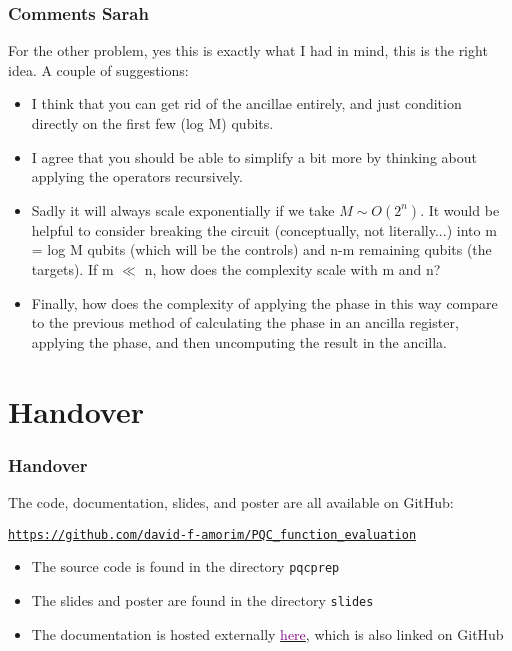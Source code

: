 \documentclass{beamer}
\begin{document}
\begin{frame}
\frametitle{Comments Sarah}
For the other problem, yes this is exactly what I had in mind, this is the right idea. A couple of suggestions:
\begin{itemize}
\item I think that you can get rid of the ancillae entirely, and just condition directly on the first few (log M) qubits.
\item I agree that you should be able to simplify a bit more by thinking about applying the operators recursively.
\item Sadly it will always scale exponentially if we take $M \sim O(2^n)$. It would be helpful to consider breaking the circuit (conceptually, not literally...) into m = log M qubits (which will be the controls) and n-m remaining qubits (the targets). If m $\ll$ n, how does the complexity scale with m and n?
\item Finally, how does the complexity of applying the phase in this way compare to the previous method of calculating the phase in an ancilla register, applying the phase, and then uncomputing the result in the ancilla.
\end{itemize}

\end{frame}



\section{Handover}

\begin{frame}

\frametitle{Handover}

The code, documentation, slides, and poster are all available on GitHub:
\begin{center}
\vspace{0.6cm}
\href{https://github.com/david-f-amorim/PQC_function_evaluation}{\texttt{https://github.com/david-f-amorim/PQC\_function\_evaluation}}
\vspace{0.6cm}
\end{center}

\begin{itemize}
\item The source code is found in the directory \alert{\texttt{pqcprep}} 
\item The slides and poster are found in the directory \alert{\texttt{slides}}
\item The documentation is hosted externally  \href{https://david-f-amorim.github.io/PQC_function_evaluation/pqcprep.html}{\textcolor{purple}{here}}, which is also linked on GitHub
\end{itemize}

\end{frame}
\end{document}
